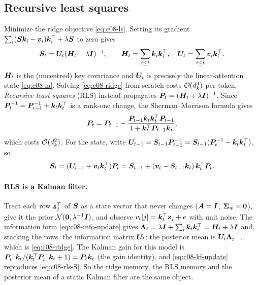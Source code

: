 \subsection{Recursive least squares}\label{sec:c08-rls}

Minimize the ridge objective \eqref{eq:c08-ls}. Setting its gradient
$\sum_i(\bm{S}\bm{k}_i-\bm{v}_i)\bm{k}_i^{\top}+\lambda\bm{S}$ to zero gives
\begin{equation}\label{eq:c08-ridge}
  \bm{S}_t = \bm{U}_t(\bm{H}_t+\lambda\bm{I})^{-1},\qquad
  \bm{H}_t=\sum_{i\le t}\bm{k}_i\bm{k}_i^{\top},\quad \bm{U}_t=\sum_{i\le t}\bm{v}_i\bm{k}_i^{\top} .
\end{equation}
$\bm{H}_t$ is the (uncentred) key covariance and $\bm{U}_t$ is precisely the linear-attention state
\eqref{eq:c08-la}. Solving \eqref{eq:c08-ridge} from scratch costs $\mathcal{O}(d_k^3)$ per token.
\emph{Recursive least squares} (RLS) instead propagates $\bm{P}_t=(\bm{H}_t+\lambda\bm{I})^{-1}$. Since
$\bm{P}_t^{-1}=\bm{P}_{t-1}^{-1}+\bm{k}_t\bm{k}_t^{\top}$ is a rank-one change, the Sherman--Morrison formula gives
\begin{equation}\label{eq:c08-rls-P}
  \bm{P}_t = \bm{P}_{t-1}-\frac{\bm{P}_{t-1}\bm{k}_t\bm{k}_t^{\top}\bm{P}_{t-1}}{1+\bm{k}_t^{\top}\bm{P}_{t-1}\bm{k}_t},
\end{equation}
which costs $\mathcal{O}(d_k^2)$. For the state, write $\bm{U}_{t-1}=\bm{S}_{t-1}\bm{P}_{t-1}^{-1}=
\bm{S}_{t-1}(\bm{P}_t^{-1}-\bm{k}_t\bm{k}_t^{\top})$, so
\begin{equation}\label{eq:c08-rls-S}
  \bm{S}_t = (\bm{U}_{t-1}+\bm{v}_t\bm{k}_t^{\top})\bm{P}_t
        = \bm{S}_{t-1} + (\bm{v}_t-\bm{S}_{t-1}\bm{k}_t)\,\bm{k}_t^{\top}\bm{P}_t .
\end{equation}

\paragraph{RLS is a Kalman filter.} Treat each row $\bm{s}_j^{\top}$ of $\bm{S}$ as a state vector that never
changes ($\bm{A}=\bm{I}$, $\bm{\Sigma}_w=\bm{0}$), give it the prior $\mathcal{N}(\bm{0},\lambda^{-1}\bm{I})$, and
observe $v_t[j]=\bm{k}_t^{\top}\bm{s}_j+e$ with unit noise. The information form
\eqref{eq:c08-info-update} gives $\bm{\Lambda}_t=\lambda\bm{I}+\sum_i\bm{k}_i\bm{k}_i^{\top}=\bm{H}_t+\lambda\bm{I}$ and,
stacking the rows, the information matrix $\bm{U}_t$; the posterior mean is
$\bm{U}_t\bm{\Lambda}_t^{-1}$, which is \eqref{eq:c08-ridge}. The Kalman gain for this model is
$\bm{P}_t^-\bm{k}_t/(\bm{k}_t^{\top}\bm{P}_t^-\bm{k}_t+1)=\bm{P}_t\bm{k}_t$ (the gain identity), and \eqref{eq:c08-kf-update}
reproduces \eqref{eq:c08-rls-S}. So the ridge memory, the RLS memory and the posterior mean of a
static Kalman filter are the same object.

